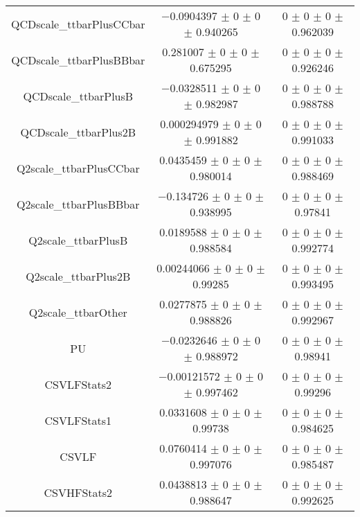 \begin{table}
\begin{tabular}{ccc}
QCDscale\_ttbarPlusCCbar 	& \num{-0.0904397} $\pm$ \num{0} $\pm$ \num{0} $\pm$ \num{0.940265} 	& \num{0} $\pm$ \num{0} $\pm$ \num{0} $\pm$ \num{0.962039}\\
QCDscale\_ttbarPlusBBbar 	& \num{0.281007} $\pm$ \num{0} $\pm$ \num{0} $\pm$ \num{0.675295} 	& \num{0} $\pm$ \num{0} $\pm$ \num{0} $\pm$ \num{0.926246}\\
QCDscale\_ttbarPlusB 	& \num{-0.0328511} $\pm$ \num{0} $\pm$ \num{0} $\pm$ \num{0.982987} 	& \num{0} $\pm$ \num{0} $\pm$ \num{0} $\pm$ \num{0.988788}\\
QCDscale\_ttbarPlus2B 	& \num{0.000294979} $\pm$ \num{0} $\pm$ \num{0} $\pm$ \num{0.991882} 	& \num{0} $\pm$ \num{0} $\pm$ \num{0} $\pm$ \num{0.991033}\\
Q2scale\_ttbarPlusCCbar 	& \num{0.0435459} $\pm$ \num{0} $\pm$ \num{0} $\pm$ \num{0.980014} 	& \num{0} $\pm$ \num{0} $\pm$ \num{0} $\pm$ \num{0.988469}\\
Q2scale\_ttbarPlusBBbar 	& \num{-0.134726} $\pm$ \num{0} $\pm$ \num{0} $\pm$ \num{0.938995} 	& \num{0} $\pm$ \num{0} $\pm$ \num{0} $\pm$ \num{0.97841}\\
Q2scale\_ttbarPlusB 	& \num{0.0189588} $\pm$ \num{0} $\pm$ \num{0} $\pm$ \num{0.988584} 	& \num{0} $\pm$ \num{0} $\pm$ \num{0} $\pm$ \num{0.992774}\\
Q2scale\_ttbarPlus2B 	& \num{0.00244066} $\pm$ \num{0} $\pm$ \num{0} $\pm$ \num{0.99285} 	& \num{0} $\pm$ \num{0} $\pm$ \num{0} $\pm$ \num{0.993495}\\
Q2scale\_ttbarOther 	& \num{0.0277875} $\pm$ \num{0} $\pm$ \num{0} $\pm$ \num{0.988826} 	& \num{0} $\pm$ \num{0} $\pm$ \num{0} $\pm$ \num{0.992967}\\
PU 	& \num{-0.0232646} $\pm$ \num{0} $\pm$ \num{0} $\pm$ \num{0.988972} 	& \num{0} $\pm$ \num{0} $\pm$ \num{0} $\pm$ \num{0.98941}\\
CSVLFStats2 	& \num{-0.00121572} $\pm$ \num{0} $\pm$ \num{0} $\pm$ \num{0.997462} 	& \num{0} $\pm$ \num{0} $\pm$ \num{0} $\pm$ \num{0.99296}\\
CSVLFStats1 	& \num{0.0331608} $\pm$ \num{0} $\pm$ \num{0} $\pm$ \num{0.99738} 	& \num{0} $\pm$ \num{0} $\pm$ \num{0} $\pm$ \num{0.984625}\\
CSVLF 	& \num{0.0760414} $\pm$ \num{0} $\pm$ \num{0} $\pm$ \num{0.997076} 	& \num{0} $\pm$ \num{0} $\pm$ \num{0} $\pm$ \num{0.985487}\\
CSVHFStats2 	& \num{0.0438813} $\pm$ \num{0} $\pm$ \num{0} $\pm$ \num{0.988647} 	& \num{0} $\pm$ \num{0} $\pm$ \num{0} $\pm$ \num{0.992625}\\

\end{tabular}
\end{table}
